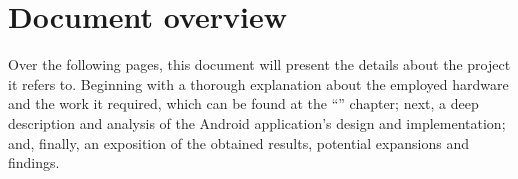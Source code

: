 	\section{Document overview}
		Over the following pages, this document will present the details about the project it refers to.
		Beginning with a thorough explanation about the	employed hardware and the work it required,
		which can be found at the ``'' chapter; next, a deep description and analysis 
		of the Android application's design and implementation; and, finally, an exposition of the obtained 
		results, potential expansions and findings.  

		



		

		
		
		
